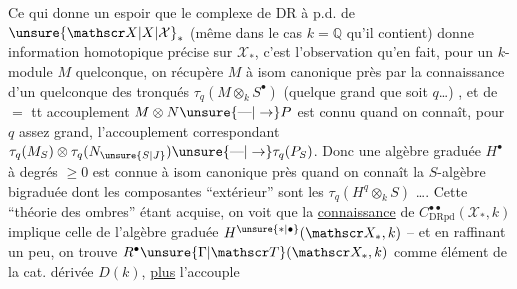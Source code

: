 Ce qui donne un espoir que le complexe de DR à p.d. de $\unsure{\mathscr X|X|\mathcal X}_\ast$  (même dans le cas $k=\mathbb Q$ \unsure{\}|)} qu'il contient) donne  information homotopique précise sur $\mathscr X_\ast$, c'est l'observation qu'en fait, pour un  $k$-module $M$ quelconque, on récupère $M$ à isom canonique près par la connaissance d'un quelconque des tronqués $\tau_q(M\otimes_k S^\bullet)$ (quelque grand que soit $q$\ldots) , et de $=$ tt accouplement $M\otimes N\unsure{\text{---}|\to}P$ est connu quand on connaît, pour $q$ assez grand, l'accouplement correspondant $\tau_q(M_S)\otimes\tau_q(N_{\unsure{S|J}})\unsure{\text{---}|\to}\tau_q(P_S)$. Donc une algèbre graduée $H^\bullet$ à degrés $\geq 0$  est connue à isom canonique près quand on connaît la $S$-algèbre bigraduée dont les composantes  ``extérieur''  sont les $\tau_q(H^q\otimes_k S)$ \ldots.  Cette ``théorie des ombres'' étant  acquise, on voit que la \uline{connaissance} de $C^{\bullet\bullet}_{\mathrm{DRpd}}(\mathscr X_\ast,k)$  implique celle de l'algèbre graduée $H^{\unsure{\ast|\bullet}}(\mathscr X_\ast,k)$ -- et en raffinant un peu, on  trouve  $R^{\bullet}\unsure{\Gamma|\mathscr T}(\mathscr X_\ast,k)$ comme élément de la cat. dérivée $D(k)$, \uline{plus} l'accouple%

